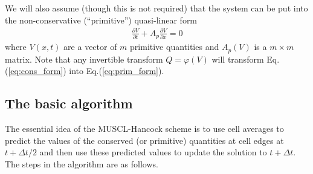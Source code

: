 \documentclass[12pt]{article}
\theoremstyle{definition}
\theoremstyle{definition}
\theoremstyle{definition}
\newcommand{\eqr}[1]{Eq.\thinspace(#1)}
\newcommand{\pfrac}[2]{\frac{\partial #1}{\partial #2}}
\begin{document}
We will also assume (though this is not required) that the system can
be put into the non-conservative (``primitive'') quasi-linear form
\begin{align}
  \pfrac{V}{t} + A_p\pfrac{V}{x} = 0 \label{eq:prim_form}
\end{align}
where $V(x,t)$ are a vector of $m$ primitive quantities and $A_p(V)$
is a $m\times m$ matrix. Note that any invertible transform
$Q=\varphi(V)$ will transform \eqr{\ref{eq:cons_form}} into
\eqr{\ref{eq:prim_form}}.

\subsection{The basic algorithm}

The essential idea of the MUSCL-Hancock scheme is to use cell averages
to predict the values of the conserved (or primitive) quantities at
cell edges at $t+\Delta t/2$ and then use these predicted values to
update the solution to $t+\Delta t$. The steps in the algorithm are as
follows.
\end{document}
